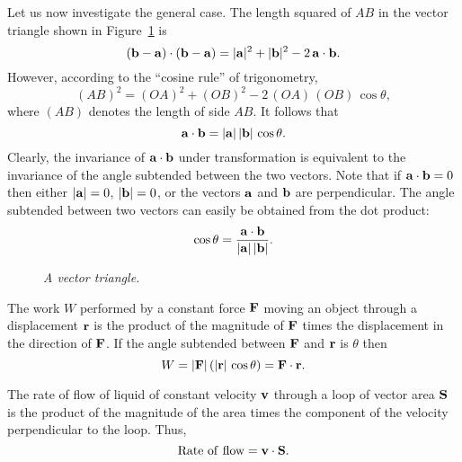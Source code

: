 Let us now investigate the general case. The length squared of $AB$ in the
vector triangle shown in Figure~\ref{f5} is
\begin{equation}
({\bf b} - {\bf a} ) \cdot ({\bf b} - {\bf a} ) = |{\bf a}|^2 + |{\bf b}|^2 - 2\,{\bf a} \cdot
{\bf b}.
\end{equation}
However, according to the ``cosine rule'' of trigonometry,
\begin{equation}
(AB)^2 = (OA)^2 + (OB)^2 - 2 \,(OA)\,(OB)\,\cos\theta,
\end{equation}
where $(AB)$ denotes the length of side $AB$. It follows that
\begin{equation}
{\bf a} \cdot {\bf b} = |{\bf a}|\, |{\bf b}|\, \cos\theta.
\end{equation}
Clearly, the invariance of ${\bf a} \cdot {\bf b}$ under transformation is equivalent
to the invariance of the angle subtended between the two vectors. Note that
if ${\bf a} \cdot {\bf b} =0$ then either $|{\bf a}|=0$, $|{\bf b}|=0$, or the vectors
$\bf a$ and $\bf b$ are perpendicular. The angle subtended between two vectors
can easily be obtained from the dot product:
\begin{equation}
\cos\theta = \frac{{\bf a} \cdot {\bf b}}{|{\bf a}| \,|{\bf b}| }.
\end{equation}
\begin{figure}
\epsfysize=1.5in
\centerline{}
\caption{\em A vector triangle.}\label{f5}
\end{figure}


The work $W$ performed by a constant force $\bf F$ moving an object through a displacement $\bf r$
is the product of the magnitude of $\bf F$ times the displacement in the direction
of $\bf F$. If the angle subtended between  $\bf F$ and $\bf r$ is $\theta$ then
\begin{equation}
W = |{\bf F}| \,(|{\bf r}|\,\cos\theta) = {\bf F}\cdot {\bf r}.
\end{equation}

The rate of flow of liquid of constant velocity $\bf v$ through a loop of vector area
$\bf S$ is the product of the magnitude of the area times the component of the
velocity perpendicular to the loop. Thus,
\begin{equation}
{\rm Rate~of~flow} = {\bf v}\cdot{\bf S}.
\end{equation}

